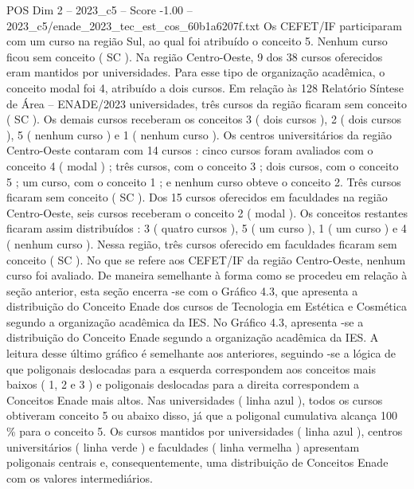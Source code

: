 \begin{textsample}{POS Dim 2 – 2023\_c5 – Score -1.00 – 2023\_c5/enade\_2023\_tec\_est\_cos\_60b1a6207f.txt}
Os CEFET/IF participaram com um curso na região Sul, ao qual foi atribuído o conceito 5.
Nenhum curso ficou sem conceito ( SC ).
Na região Centro-Oeste, 9 dos 38 cursos oferecidos eram mantidos por universidades.
Para esse tipo de organização acadêmica, o conceito modal foi 4, atribuído a dois cursos.
Em relação às 128 Relatório Síntese de Área – ENADE/2023 universidades, três cursos da região ficaram sem conceito ( SC ).
Os demais cursos receberam os conceitos 3 ( dois cursos ), 2 ( dois cursos ), 5 ( nenhum curso ) e 1 ( nenhum curso ).
Os centros universitários da região Centro-Oeste contaram com 14 cursos : cinco cursos foram avaliados com o conceito 4 ( modal ) ; três cursos, com o conceito 3 ; dois cursos, com o conceito 5 ; um curso, com o conceito 1 ; e nenhum curso obteve o conceito 2.
Três cursos ficaram sem conceito ( SC ).
Dos 15 cursos oferecidos em faculdades na região Centro-Oeste, seis cursos receberam o conceito 2 ( modal ).
Os conceitos restantes ficaram assim distribuídos : 3 ( quatro cursos ), 5 ( um curso ), 1 ( um curso ) e 4 ( nenhum curso ).
Nessa região, três cursos oferecido em faculdades ficaram sem conceito ( SC ).
No que se refere aos CEFET/IF da região Centro-Oeste, nenhum curso foi avaliado.
De maneira semelhante à forma como se procedeu em relação à seção anterior, esta seção encerra -se com o Gráfico 4.3, que apresenta a distribuição do Conceito Enade dos cursos de Tecnologia em Estética e Cosmética segundo a organização acadêmica da IES.
No Gráfico 4.3, apresenta -se a distribuição do Conceito Enade segundo a organização acadêmica da IES.
A leitura desse último gráfico é semelhante aos anteriores, seguindo -se a lógica de que poligonais deslocadas para a esquerda correspondem aos conceitos mais baixos ( 1, 2 e 3 ) e poligonais deslocadas para a direita correspondem a Conceitos Enade mais altos.
Nas universidades ( linha azul ), todos os cursos obtiveram conceito 5 ou abaixo disso, já que a poligonal cumulativa alcança 100 \% para o conceito 5.
Os cursos mantidos por universidades ( linha azul ), centros universitários ( linha verde ) e faculdades ( linha vermelha ) apresentam poligonais centrais e, consequentemente, uma distribuição de Conceitos Enade com os valores intermediários.

\end{textsample}
